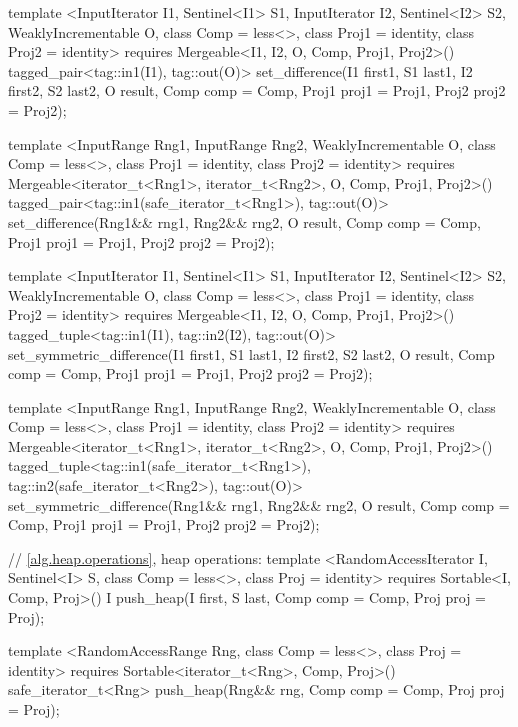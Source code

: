 \begin{codeblock}
{{{{  template <InputIterator I1, Sentinel<I1> S1, InputIterator I2, Sentinel<I2> S2,
      WeaklyIncrementable O, class Comp = less<>, class Proj1 = identity, class Proj2 = identity>
    requires Mergeable<I1, I2, O, Comp, Proj1, Proj2>()
    tagged_pair<tag::in1(I1), tag::out(O)>
      set_difference(I1 first1, S1 last1, I2 first2, S2 last2, O result,
                     Comp comp = Comp{}, Proj1 proj1 = Proj1{}, Proj2 proj2 = Proj2{});

  template <InputRange Rng1, InputRange Rng2, WeaklyIncrementable O,
      class Comp = less<>, class Proj1 = identity, class Proj2 = identity>
    requires Mergeable<iterator_t<Rng1>, iterator_t<Rng2>, O, Comp, Proj1, Proj2>()
    tagged_pair<tag::in1(safe_iterator_t<Rng1>), tag::out(O)>
      set_difference(Rng1&& rng1, Rng2&& rng2, O result,
                     Comp comp = Comp{}, Proj1 proj1 = Proj1{}, Proj2 proj2 = Proj2{});

  template <InputIterator I1, Sentinel<I1> S1, InputIterator I2, Sentinel<I2> S2,
      WeaklyIncrementable O, class Comp = less<>, class Proj1 = identity, class Proj2 = identity>
    requires Mergeable<I1, I2, O, Comp, Proj1, Proj2>()
    tagged_tuple<tag::in1(I1), tag::in2(I2), tag::out(O)>
      set_symmetric_difference(I1 first1, S1 last1, I2 first2, S2 last2, O result,
                               Comp comp = Comp{}, Proj1 proj1 = Proj1{},
                               Proj2 proj2 = Proj2{});

  template <InputRange Rng1, InputRange Rng2, WeaklyIncrementable O,
      class Comp = less<>, class Proj1 = identity, class Proj2 = identity>
    requires Mergeable<iterator_t<Rng1>, iterator_t<Rng2>, O, Comp, Proj1, Proj2>()
    tagged_tuple<tag::in1(safe_iterator_t<Rng1>),
                 tag::in2(safe_iterator_t<Rng2>),
                 tag::out(O)>
      set_symmetric_difference(Rng1&& rng1, Rng2&& rng2, O result, Comp comp = Comp{},
                               Proj1 proj1 = Proj1{}, Proj2 proj2 = Proj2{});

  // \ref{alg.heap.operations}, heap operations:
  template <RandomAccessIterator I, Sentinel<I> S, class Comp = less<>,
      class Proj = identity>
    requires Sortable<I, Comp, Proj>()
    I push_heap(I first, S last, Comp comp = Comp{}, Proj proj = Proj{});

  template <RandomAccessRange Rng, class Comp = less<>, class Proj = identity>
    requires Sortable<iterator_t<Rng>, Comp, Proj>()
    safe_iterator_t<Rng>
      push_heap(Rng&& rng, Comp comp = Comp{}, Proj proj = Proj{});

}}}}
\end{codeblock}
